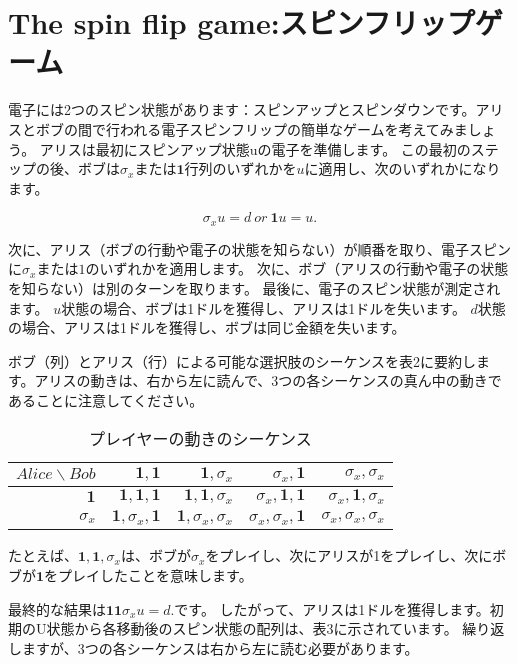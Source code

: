 \section{The spin flip game:スピンフリップゲーム}
\label{sec:the_spin_flip_game}


電子には2つのスピン状態があります：スピンアップとスピンダウンです。アリスとボブの間で行われる電子スピンフリップの簡単なゲームを考えてみましょう。
アリスは最初にスピンアップ状態uの電子を準備します。 この最初のステップの後、ボブは$\sigma_x$または$\mathbf{1}$行列のいずれかを$u$に適用し、次のいずれかになります。

\begin{equation}
\label{16}
\sigma_x u = d
\ or \ 
\mathbf{1}u = u.
\end{equation}

次に、アリス（ボブの行動や電子の状態を知らない）が順番を取り、電子スピンに$\sigma_x$または$1$のいずれかを適用します。
次に、ボブ（アリスの行動や電子の状態を知らない）は別のターンを取ります。 最後に、電子のスピン状態が測定されます。
$u$状態の場合、ボブは1ドルを獲得し、アリスは1ドルを失います。 $d$状態の場合、アリスは1ドルを獲得し、ボブは同じ金額を失います。

ボブ（列）とアリス（行）による可能な選択肢のシーケンスを表2に要約します。アリスの動きは、右から左に読んで、3つの各シーケンスの真ん中の動きであることに注意してください。

\begin{table}[htb]
\caption{プレイヤーの動きのシーケンス}
\centering
  \begin{tabular}{|r||r|r|r|r|} \hline
    $Alice \backslash Bob$ & $\mathbf{1}, \mathbf{1}$  &  $\mathbf{1}, \sigma_x $  & $ \sigma_x,\mathbf{1} $ & $\sigma_x, \sigma_x $  \\ \hline \hline
    $\mathbf{1}$ & $\mathbf{1}, \mathbf{1},\mathbf{1}$ & $\mathbf{1}, \mathbf{1},\sigma_x$ & $\sigma_x, \mathbf{1},\mathbf{1}$ & $\sigma_x, \mathbf{1},\sigma_x$ \\
    $\sigma_x$ & $\mathbf{1}, \sigma_x,\mathbf{1}$ & $ \mathbf{1}, \sigma_x,\sigma_x$ & $\sigma_x, \sigma_x,\mathbf{1}$ & $\sigma_x, \sigma_x,\sigma_x$\\ \hline
  \end{tabular}
\end{table}


たとえば、$\mathbf{1},\mathbf{1}, \sigma_x$は、ボブが$\sigma_x$をプレイし、次にアリスが1をプレイし、次にボブが$\mathbf{1}$をプレイしたことを意味します。

最終的な結果は$\mathbf{11} \sigma_x u = d.$です。 
したがって、アリスは1ドルを獲得します。初期のU状態から各移動後のスピン状態の配列は、表3に示されています。 繰り返しますが、3つの各シーケンスは右から左に読む必要があります。

